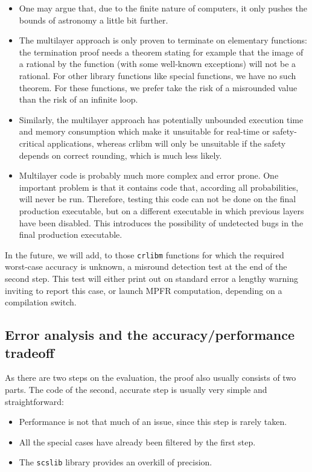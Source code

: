 \begin{itemize}

\item One may argue that, due to the finite nature of computers, it
  only pushes the bounds of astronomy a little bit further.

\item The multilayer approach is only proven to terminate on
  elementary functions: the termination proof needs a theorem stating
  for example that the image of a rational by the function (with some
  well-known exceptions) will not be a rational. For other library
  functions like  special functions, we have no such theorem.
  For these functions, we prefer take the risk of a misrounded
  value than the risk of an infinite loop.

\item Similarly, the multilayer approach has potentially unbounded
  execution time and memory consumption which make it unsuitable for
  real-time or safety-critical applications, whereas crlibm will only
  be unsuitable if the safety depends on correct rounding, which is
  much less likely.

\item Multilayer code is probably much more complex and error prone.
  One important problem is that it contains code that, according all
  probabilities, will never be run. Therefore, testing this code can
  not be done on the final production executable, but on a different
  executable in which previous layers have been disabled. This
  introduces the possibility of undetected bugs in the final
  production executable.

\end{itemize}

In the future, we will add, to those \texttt{crlibm} functions for
which the required worst-case accuracy is unknown, a misround
detection test at the end of the second step. This test will either
print out on standard error a lengthy warning inviting to report this
case, or launch MPFR computation, depending on a compilation switch.



\subsection{Error analysis and the accuracy/performance tradeoff
  \label{sec:error-accuracy-perf}}

As there are two steps on the evaluation, the proof also usually
consists of two parts. The code of the second, accurate step is
usually very simple and straightforward:
\begin{itemize}
\item Performance is not that much of an issue, since this step is rarely taken.
\item All the special cases have already been filtered by the first step.
\item The \texttt{scslib} library provides an overkill of precision.
\end{itemize}

